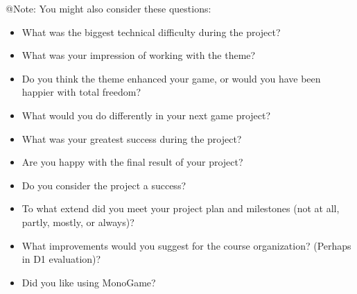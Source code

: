 \begin{TempText}
	@Note:  You might also consider these questions:
	\begin{itemize}
		\item What was the biggest technical difficulty during the project? \\
		\item What was your impression of working with the theme? \\
		\item Do you think the theme enhanced your game, or would you have been happier with total freedom? \\
		\item What would you do differently in your next game project? \\
		\item What was your greatest success during the project? \\
		\item Are you happy with the final result of your project? \\ 
		\item Do you consider the project a success? \\
		\item To what extend did you meet your project plan and milestones (not at all, partly, mostly, or always)? \\
		\item What improvements would you suggest for the course organization? (Perhaps in D1 evaluation)? \\
		\item Did you like using MonoGame?
	\end{itemize}
\end{TempText}

